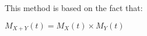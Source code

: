 This method is based on the fact that:
\begin{center}
	$M_{X+Y}(t)=M_{X}(t)\times M_{Y}(t)$
\end{center}
